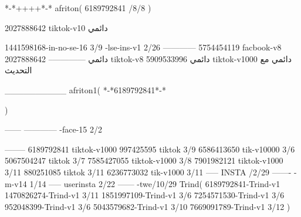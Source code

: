 *-*++++*-*
afriton(
6189792841 /8/8
)

2027888642 tiktok-v10
دائمي

1441598168-in-no-se-16 3/9
-lse-ins-v1 2/26
------------
5754454119 facbook-v8
دائمي
--------------
2027888642 tiktok-v8
دائمي
5909533996 tiktok-v1000
دائمي مع التحديث

__________
afriton1(
*-*6189792841*-*

)


------
------------
-face-15 2/2

--------
6189792841 tiktok-v1000
997425595 tiktok 3/9
6586413650 tik-v10000 3/6
5067504247 tiktok 3/7
7585427055 tiktok-v1000 3/8
7901982121 tiktok-v1000 3/11
880251085 tiktok 3/11
6236773032 tik-v1000 3/11
-----
 INSTA /2/29
-------
-m-v14 1/14
-----
userinsta 2/22
------
-twe/10/29
Trind(
6189792841-Trind-v1 
1470826274-Trind-v1 3/11
1851997109-Trind-v1 3/6
7254571530-Trind-v1 3/6
952048399-Trind-v1 3/6
5043579682-Trind-v1 3/10
7669091789-Trind-v1 3/12
)
